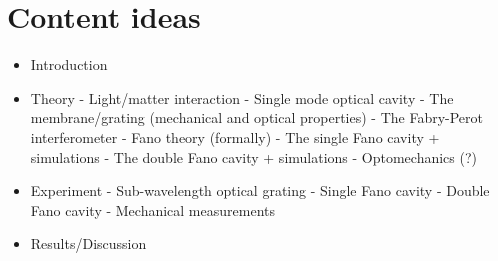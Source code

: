 
\section{Content ideas}

\begin{itemize}
    \item Introduction
    \item Theory
    \subitem - Light/matter interaction
    \subitem - Single mode optical cavity
    \subitem - The membrane/grating (mechanical and optical properties) 
    \subitem - The Fabry-Perot interferometer
    \subitem - Fano theory (formally) 
    \subitem - The single Fano cavity + simulations
    \subitem - The double Fano cavity + simulations
    \subitem - Optomechanics (?)
    \item Experiment
    \subitem - Sub-wavelength optical grating
    \subitem - Single Fano cavity
    \subitem - Double Fano cavity
    \subitem - Mechanical measurements
    \item Results/Discussion
\end{itemize}

